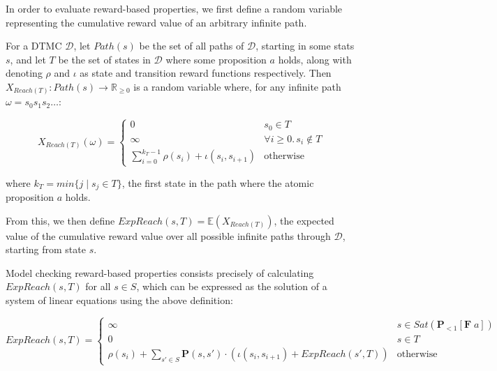 In order to evaluate reward-based properties, we first define a random variable representing the cumulative reward value of an arbitrary infinite path.

\begin{definition}
\label{back:reach_reward}

For a DTMC $\mathcal{D}$, let $Path(s)$ be the set of all paths of $\mathcal{D}$, starting in some stats $s$, and let $T$ be the set of states in $\mathcal{D}$ where some proposition $a$ holds, along with denoting $\rho$ and $\iota$ as state and transition reward functions respectively. Then $X_{Reach(T)} : Path(s) \rightarrow \mathbb{R}_{\geq 0}$ is a random variable where, for any infinite path $\omega = s_{0} s_{1} s_{2} \dots$:

    \begin{equation*} 
        X_{Reach(T)}(\omega) = 
            \begin{cases}
                0 & s_0 \in T \\
                \infty & \forall i \geq 0 . \, s_i \notin T  \\
                \sum_{i=0}^{k_{T} - 1} \rho(s_i) + \iota(s_i, s_{i+1}) & \text{otherwise}
            \end{cases}
    \end{equation*}

where $k_T = min \{ j \mid s_j \in T \}$, the first state in the path where the atomic proposition $a$ holds.

From this, we then define $ExpReach(s, T) = \mathbb{E}(X_{Reach(T)})$, the expected value of the cumulative reward value over all possible infinite paths through $\mathcal{D}$, starting from state $s$.

\end{definition}

Model checking reward-based properties consists precisely of calculating $ExpReach(s, T)$ for all $s \in S$,  which can be expressed as the solution of a system of linear equations using the above definition:

\begin{equation*}
    ExpReach(s, T) = 
        \begin{cases}
            \infty & s \in Sat(\mathbf{P}_{<1} [\mathbf{F} \; a]) \\ 
            0 & s \in T \\
            \rho(s_i) + \sum_{s' \in S} \mathbf{P}(s, s') \cdot \left( \iota(s_i, s_{i+1}) + ExpReach(s', T) \right) & \text{otherwise}
        \end{cases}
\end{equation*}

